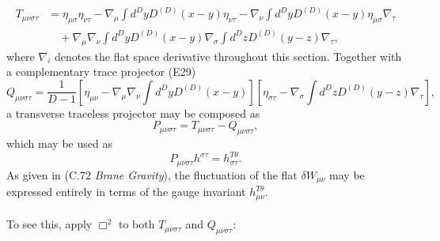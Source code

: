 \documentclass[10pt,letterpaper]{article}
\begin{document}
\begin{align}
T_{\mu\nu\sigma\tau} &= \eta_{\mu\sigma}\eta_{\nu\tau} - \nabla_\mu \int d^Dy D^{(D)}(x-y)\eta_{\nu\tau} - \nabla_\nu
\int d^Dy D^{(D)}(x-y)\eta_{\mu\sigma}\nabla_\tau \nonumber\\
&\quad + \nabla_\mu\nabla_\nu \int d^Dy D^{(D)}(x-y)\nabla_\sigma \int d^Dz D^{(D)}(y-z)\nabla_\tau,
\end{align}
where $\nabla_i$ denotes the flat space derivative throughout this section.
Together with a complementary trace projector (E29)
\begin{equation}Q_{\mu\nu\sigma\tau} = \frac{1}{D-1} \left[ \eta_{\mu\nu} - \nabla_\mu\nabla_\nu \int d^Dy D^{(D)}(x-y) \right]
\left[ \eta_{\sigma\tau} - \nabla_\sigma \int d^Dz D^{(D)}(y-z) \nabla_\tau \right],
\end{equation}
a transverse traceless projector may be composed as
\begin{equation}
P_{\mu\nu\sigma\tau} = T_{\mu\nu\sigma\tau}-Q_{\mu\nu\sigma\tau},
\end{equation}
which may be used as
\begin{equation}
P_{\mu\nu\sigma\tau}h^{\sigma\tau} = h^{T\theta}_{\sigma\tau}.
\end{equation}
As given in (C.72 \emph{Brane Gravity}), the fluctuation of the flat $\delta W_{\mu\nu}$ may be expressed entirely in terms of the gauge invariant $h_{\mu\nu}^{T\theta}$. 
\\ \\
To see this, apply $\Box^2$ to both $T_{\mu\nu\sigma\tau}$ and $Q_{\mu\nu\sigma\tau}$:
\end{document}
